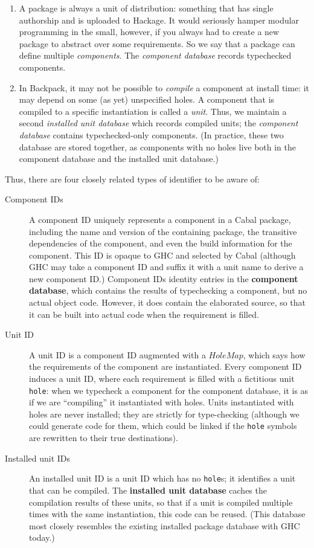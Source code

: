 \documentclass{article}
\newcommand{\I}[1]{\ensuremath{\mathit{#1}}}
\begin{document}
\begin{enumerate}
    \item A package is always a unit of distribution: something that has
    single authorship and is uploaded to Hackage.  It would seriously hamper
    modular programming in the small, however, if you always had to create
    a new package to abstract over some requirements.  So we say that a
    package can define multiple \emph{components}.  The \emph{component database}
    records typechecked components.
    \item  In Backpack, it may not be possible to \emph{compile} a component
    at install time: it may depend on some (as yet) unspecified holes.
    A component that is compiled to a specific instantiation is called a
    \emph{unit}.  Thus, we maintain a second \emph{installed unit database}
    which records compiled units; the \emph{component database} contains
    typechecked-only components.  (In practice, these two database are
    stored together, as components with no holes live both in the component
    database and the installed unit database.)
\end{enumerate}
%
Thus, there are four closely related types of identifier to be aware of:

\begin{description}
\item[Component IDs]  A component ID uniquely represents a component
in a Cabal package, including the name and version of the containing package,
the transitive dependencies of the component, and even the build information
for the component.  This ID is opaque to GHC and selected by Cabal
(although GHC may take a component ID and suffix it with a unit name to
derive a new component ID.)  Component IDs identity entries in the
\textbf{component database}, which contains the results of typechecking
a component, but no actual object code.  However, it does contain the
elaborated source, so that it can be built into actual code when
the requirement is filled.

\item[Unit ID]  A unit ID is a component ID augmented with a
\I{HoleMap}, which says how the requirements of the component are
instantiated.  Every component ID induces a unit ID, where each
requirement is filled with a fictitious unit \verb|hole|: when we
typecheck a component for the component database, it is as if we are
``compiling'' it instantiated with holes.  Units instantiated with holes
are never installed; they are strictly for type-checking (although we
could generate code for them, which could be linked if the \verb|hole|
symbols are rewritten to their true destinations).

\item[Installed unit IDs]  An installed unit ID is a unit ID which has
no \verb|hole|s; it identifies a unit that can be compiled.  The
\textbf{installed unit database} caches the compilation results of these
units, so that if a unit is compiled multiple times with the same
instantiation, this code can be reused. (This database most closely
resembles the existing installed package database with GHC today.)
\end{description}
\end{document}
